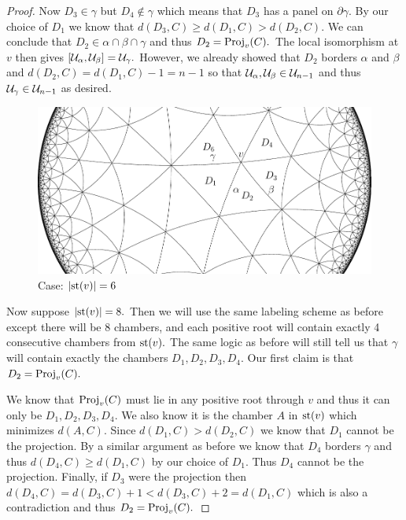 \documentclass[class=book, crop=false]{standalone}
\begin{document}
\begin{proof}
	Now $D_3\in \gamma$ but $D_4\not\in \gamma$ which means that $D_3$ has a panel on $\partial\gamma.$ By our choice of $D_1$ we know that $d(D_3,C)\ge d(D_1,C)>d(D_2,C).$ We can conclude that $D_2\in \alpha\cap \beta\cap \gamma$ and thus $D_2=\mathrm{Proj}_v(C).$ The local isomorphism at $v$ then gives $[\mathcal{U}_\alpha,\mathcal{U}_\beta]=\mathcal{U}_\gamma.$ However, we already showed that $D_2$ borders $\alpha$ and $\beta$ and $d(D_2,C)=d(D_1,C)-1=n-1$ so that $\mathcal{U}_\alpha,\mathcal{U}_\beta\in \mathcal{U}_{n-1}$ and thus $\mathcal{U}_\gamma\in \mathcal{U}_{n-1}$ as desired.\\
	\begin{figure}
		\label{deg6433f2}
		\includegraphics{diagrams/deg6433f2.pdf}
		\caption{Case: $|\mathrm{st}(v)|=6$}
	\end{figure}


	Now suppose $|\mathrm{st}(v)|=8.$ Then we will use the same labeling scheme as before except there will be $8$ chambers, and each positive root will contain exactly 4 consecutive chambers from $\mathrm{st}(v).$ The same logic as before will still tell us that $\gamma$ will contain exactly the chambers $D_1,D_2,D_3,D_4.$ Our first claim is that $D_2=\mathrm{Proj}_v(C).$

	We know that $\mathrm{Proj}_v(C)$ must lie in any positive root through $v$ and thus it can only be $D_1,D_2,D_3,D_4.$ We also know it is the chamber $A$ in $\mathrm{st}(v)$ which minimizes $d(A,C).$ Since $d(D_1,C)>d(D_2,C)$ we know that $D_1$ cannot be the projection. By a similar argument as before we know that $D_4$ borders $\gamma$ and thus $d(D_4,C)\ge d(D_1,C)$ by our choice of $D_1.$ Thus $D_4$ cannot be the projection. Finally, if $D_3$ were the projection then $d(D_4,C)=d(D_3,C)+1<d(D_3,C)+2=d(D_1,C)$ which is also a contradiction and thus $D_2=\mathrm{Proj}_v(C).$


\end{proof}
\end{document}
